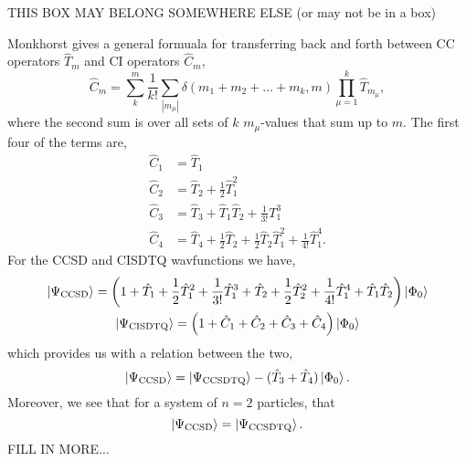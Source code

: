 \begin{tcolorbox}[title={Difference between Coupled Cluster and Configuration Interaction}, 
    colback={white},
    colbacktitle={pink},
    coltitle={black}]

    THIS BOX MAY BELONG SOMEWHERE ELSE (or may not be in a box)

    Monkhorst\cite{monkhorst1977calculation} gives a general formuala for transferring 
    back and forth between CC operators $\hat{T}_m$ and CI operators $\hat{C}_m$,
    \begin{equation}
        \hat{C}_m = \sum_{k}^m\frac{1}{k!}\sum_{|m_\mu|}
            \delta(m_1 + m_2 + \dots + m_k, m) \prod_{\mu=1}^k\hat{T}_{m_\mu},
    \end{equation}
    where the second sum is over all sets of $k$ $m_\mu$-values that sum up to $m$.
    The first four of the terms are,
    \begin{align}
        \hat{C}_1 &= \hat{T}_1 \\
        \hat{C}_2 &= \hat{T}_2 + \frac{1}{2} \hat{T}_1^2 \\
        \hat{C}_3 &= \hat{T}_3 + \hat{T}_1\hat{T}_2 + \frac{1}{3!} T_1^3 \\
        \hat{C}_4 &= \hat{T}_4 + \frac{1}{2}\hat{T}_2
            + \frac{1}{2}\hat{T}_2\hat{T}_1^2 + \frac{1}{4!}\hat{T}_1^4.
    \end{align}
    For the CCSD and CISDTQ wavfunctions we have,
    \begin{gather}
        \ket{\Psi_{\text{CCSD}}} = \left(
            1 + \hat{T}_1 + \frac{1}{2}\hat{T}_1^2 + \frac{1}{3!}\hat{T}_1^3 
            + \hat{T}_2 + \frac{1}{2}\hat{T}_2^2 + \frac{1}{4!}\hat{T}_1^4 
            + \hat{T}_1\hat{T}_2 
        \right) \ket{\Phi_0} \\
        \ket{\Psi_{\text{CISDTQ}}} = \left(
            1 + \hat{C}_1 + \hat{C}_2  + \hat{C}_3 + \hat{C}_4
        \right)\ket{\Phi_0}
    \end{gather}
    which provides us with a relation between the two,
    \begin{equation}
        \ket{\Psi_{\text{CCSD}}} 
            = \ket{\Psi_{\text{CCSDTQ}}} - (\hat{T}_3 + \hat{T}_4)\ket{\Phi_0}.
    \end{equation}
    Moreover, we see that for a system of $n=2$ particles, that
    \begin{equation}
        \ket{\Psi_{\text{CCSD}}} = \ket{\Psi_{\text{CCSDTQ}}}.
    \end{equation}
    FILL IN MORE...
\end{tcolorbox}

